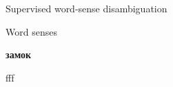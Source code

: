 \documentclass[10pt, compress]{beamer}
\begin{document}
\begin{frame}
\begin{center}
\begin{onlyenv}
\end{onlyenv}




\end{center}
% 


\end{frame}

\begin{frame}[standout]
 
Supervised word-sense disambiguation
 
\end{frame}

\begin{frame}{Word senses}

\begin{block}
\begin{center}
{\Large \textbf{замок}}
\end{center}
\end{block}

\begin{block}
fff
\end{block}
  
\end{frame}










\end{document}
